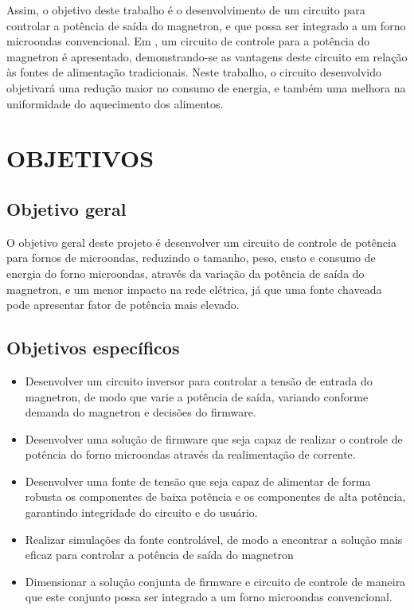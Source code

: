  Assim, o objetivo deste trabalho é o desenvolvimento de um circuito para controlar a potência de saída do magnetron, e que possa ser integrado a um forno microondas convencional. Em \cite{Hidenori1991}, um circuito de controle para a potência do magnetron é apresentado, demonstrando-se as vantagens deste circuito em relação às fontes de alimentação tradicionais. Neste trabalho, o circuito desenvolvido objetivará uma redução maior no consumo de energia, e também uma melhora na uniformidade do aquecimento dos alimentos.


\section{OBJETIVOS}
\label{sec:objetivos}


\subsection{Objetivo geral}
\label{sec:objetivosGerais}

O objetivo geral deste projeto é desenvolver um circuito de controle de potência para fornos de microondas, reduzindo o tamanho, peso, custo e consumo de energia do forno microondas, através da variação da potência de saída do magnetron, e um menor impacto na rede elétrica, já que uma fonte chaveada pode apresentar fator de potência mais elevado.

\subsection{Objetivos específicos}
\label{sec:objetivosEspecificos}

\begin{itemize}
    \item Desenvolver um circuito inversor para controlar a tensão de entrada do magnetron, de modo que varie a potência de saída, variando conforme demanda do magnetron e decisões do firmware.
    \item Desenvolver uma solução de firmware que seja capaz de realizar o controle de potência do forno microondas através da realimentação de corrente. 
    \item Desenvolver uma fonte de tensão que seja capaz de alimentar de forma robusta os componentes de baixa potência e os componentes de alta potência, garantindo integridade do circuito e do usuário. 
    \item Realizar simulações da fonte controlável, de modo a encontrar a solução mais eficaz para controlar a potência de saída do magnetron
    \item Dimensionar a solução conjunta de firmware e circuito de controle de maneira que este conjunto possa ser integrado a um forno microondas convencional.
\end{itemize}


